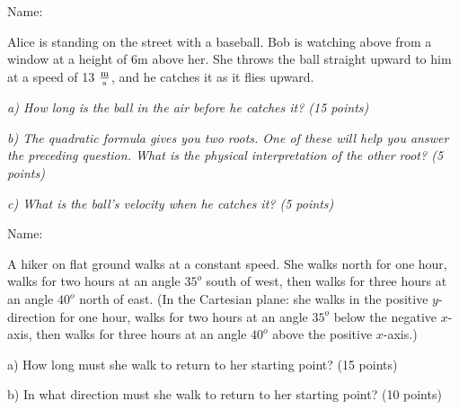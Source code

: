 \documentclass[12pt]{article}
\begin{document}
\newpage

\begin{flushright}
    Name: \underline{\hspace{3in}}
  \end{flushright}

  \Large \centerline{}
  \normalsize
\rm
Alice is standing on the street with a baseball. Bob is watching above from a window at a height of 6m above her. She throws the ball straight upward to him at
a speed of 13 $\frac{\rm m}{\rm s}$, and he catches it as it flies upward.

\bigskip

\it{a) How long is the ball in the air before he catches it? (15 points)}

\vspace{3in}

\it{b) The quadratic formula gives you two roots. One of these will help you answer the preceding question. What is the physical interpretation of the other root? (5 points)}
\vspace{1in}

\it{c) What is the ball's velocity when he catches it? (5 points)}


  \newpage

\begin{flushright}
    Name: \underline{\hspace{3in}}
  \end{flushright}

  \Large \centerline{}
  \normalsize
\rm

A hiker on flat ground walks at a constant speed. She walks north for one hour, walks for two hours at an angle $35^o$ south of west, then walks for three hours at an angle
$40^o$ north of east. (In the Cartesian plane: she walks in the positive $y$-direction for one hour, walks for two hours at an angle $35^o$ below the negative $x$-axis, then walks 
for three hours at an angle $40^o$ above the positive $x$-axis.)

\bigskip
  
\it

a) How long must she walk to return to her starting point? (15 points)

\vspace{3in}

b) In what direction must she walk to return to her starting point? (10 points)
\end{document}
